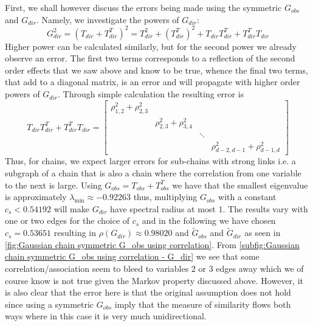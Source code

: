 \documentclass[../Thesis.tex]{subfiles}
\begin{document}
First, we shall however discuss the errors being made using the symmetric $G_{obs}$ and $G_{dir}$. Namely, we investigate the powers of $G_{dir}$:
$$G_{dir}^2 = \left(T_{dir} + T_{dir}^T\right)^2 = T_{dir}^2 + \left(T_{dir}^T\right)^2 + T_{dir} T_{dir}^T + T_{dir}^T T_{dir}$$
Higher power can be calculated similarly, but for the second power we already observe an error. The first two terms corresponds to a reflection of the second order effects that we saw above and know to be true, whence the final two terms, that add to a diagonal matrix, is an error and will propagate with higher order powers of $G_{dir}$. Through simple calculation the resulting error is
$$T_{dir} T_{dir}^T + T_{dir}^T T_{dir} = \begin{bmatrix}
        \rho_{1,2}^2 + \rho_{2,3}^2 &                             &        &                                   \\
                                    & \rho_{2,3}^2 + \rho_{3,4}^2 &        &                                   \\
                                    &                             & \ddots &                                   \\
                                    &                             &        & \rho_{d-2,d-1}^2 + \rho_{d-1,d}^2
    \end{bmatrix}$$
Thus, for chains, we expect larger errors for sub-chains with strong links i.e. a subgraph of a chain that is also a chain where the correlation from one variable to the next is large. Using $G_{obs} = T_{obs} + T_{obs}^T$ we have that the smallest eigenvalue is approximately $\lambda_{\min} \approx -0.92263$ thus, multiplying $G_{obs}$ with a constant $c_s < 0.54192$ will make $G_{dir}$ have spectral radius at most $1$. The results vary with one or two edges for the choice of $c_s$ and in the following we have chosen $c_s = 0.53651$ resulting in $\rho\left(G_{dir}\right) \approx 0.98020$ and $\tilde{G}_{obs}$ and $\tilde{G}_{dir}$ as seen in \autoref{fig:Gaussian chain symmetric G_obs using correlation}. From \autoref{subfig:Gaussian chain symmetric G_obs using correlation - G_dir} we see that some correlation/association seem to bleed to variables $2$ or $3$ edges away which we of course know is not true given the Markov property discussed above. However, it is also clear that the error here is that the original assumption does not hold since using a symmetric $G_{obs}$ imply that the measure of similarity flows both ways where in this case it is very much unidirectional.
\end{document}
